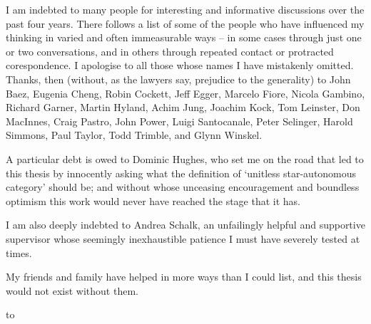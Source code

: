 
I am indebted to many people for interesting and informative
discussions over the past four years. There follows a list of some
of the people who have
influenced my thinking in varied and often immeasurable ways -- in some cases
through just one or two conversations, and in others through repeated
contact or protracted corespondence. I apologise to
all those whose names I have mistakenly omitted. Thanks, then
(without, as the lawyers say, prejudice to the generality) to
John Baez,
Eugenia Cheng,
Robin Cockett,
Jeff Egger,
Marcelo Fiore,
Nicola Gambino,
Richard Garner,
Martin Hyland,
Achim Jung,
Joachim Kock,
Tom Leinster,
Don MacInnes,
Craig Pastro,
John Power,
Luigi Santocanale,
Peter Selinger,
Harold Simmons,
Paul Taylor,
Todd Trimble,
and
Glynn Winskel.

A particular debt is owed to Dominic Hughes, who set me on the road
that led to this thesis by innocently asking what the definition of
`unitless star-aut\-on\-om\-ous category' should be; and without whose
unceasing encouragement and boundless optimism this work would
never have reached the stage that it has.

I am also deeply indebted to Andrea Schalk, an unfailingly helpful and
supportive supervisor whose seemingly inexhaustible patience I must
have severely tested at times.

My friends and family have helped in more ways than I
could list, and this thesis would not exist without them.


\newpage\thispagestyle{plain}
\vbox to 
